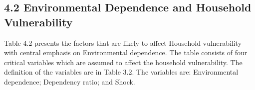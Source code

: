 \subsection*{4.2 Environmental Dependence and Household Vulnerability}
\renewcommand{\thepage}{\arabic{page}}  
Table 4.2 presents the factors that are likely to affect Household vulnerability with central emphasis on Environmental dependence. The table consists of four critical variables which are assumed to affect the household vulnerability. The definition of the variables are in Table 3.2. The variables are: Environmental dependence; Dependency ratio; and Shock.


\begin{table}[H]
	\captionsetup{labelformat=empty}
	\caption{Table 4.2: Household Vulnerability and Environmental Dependence}
	\renewcommand{\arraystretch}{0.9}
\end{table}
